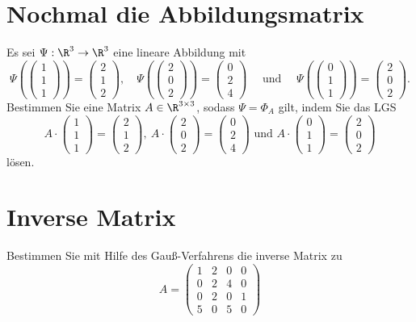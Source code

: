 \section{Nochmal die Abbildungsmatrix}
Es sei $\Psi: \R^3 \to \R^3$ eine lineare Abbildung mit
$$
\Psi(\begin{pmatrix}1\\1\\1 \end{pmatrix}) = \begin{pmatrix}2 \\ 1 \\ 2 \end{pmatrix}, \quad \Psi(\begin{pmatrix} 2 \\ 0\\ 2 \end{pmatrix}) = \begin{pmatrix}0\\2\\4 \end{pmatrix} \quad \text{ und } \quad \Psi(\begin{pmatrix} 0\\1\\1\end{pmatrix} )= \begin{pmatrix} 2 \\ 0 \\ 2\end{pmatrix}.
$$
Bestimmen Sie eine Matrix $A \in \R^{3\times 3}$, sodass $\Psi=\Phi_A$ gilt, indem Sie das LGS
$$
A\cdot \begin{pmatrix}1\\1\\1 \end{pmatrix}= \begin{pmatrix}2 \\ 1 \\ 2 \end{pmatrix},\ 
A\cdot \begin{pmatrix}2\\0\\2 \end{pmatrix}= \begin{pmatrix}0 \\ 2 \\ 4 \end{pmatrix} \text{ und }
A\cdot \begin{pmatrix}0\\1\\1 \end{pmatrix}= \begin{pmatrix}2 \\ 0 \\ 2 \end{pmatrix} 
$$
lösen. 
%

\section{Inverse Matrix}
Bestimmen Sie mit Hilfe des Gauß-Verfahrens die inverse Matrix zu
$$
A= \begin{pmatrix}1&2 & 0&0 \\ 0 & 2 & 4 & 0 \\ 0& 2 & 0 & 1 \\ 5 & 0& 5 & 0  \end{pmatrix}
$$


